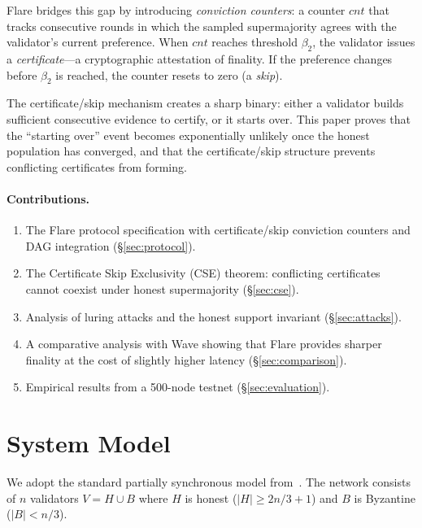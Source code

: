 \documentclass[11pt,a4paper]{article}
\begin{document}
Flare bridges this gap by introducing \emph{conviction counters}: a counter $cnt$ that
tracks consecutive rounds in which the sampled supermajority agrees with the validator's
current preference. When $cnt$ reaches threshold $\beta_2$, the validator issues a
\emph{certificate}---a cryptographic attestation of finality. If the preference changes
before $\beta_2$ is reached, the counter resets to zero (a \emph{skip}).

The certificate/skip mechanism creates a sharp binary: either a validator builds sufficient
consecutive evidence to certify, or it starts over. This paper proves that the
``starting over'' event becomes exponentially unlikely once the honest population
has converged, and that the certificate/skip structure prevents conflicting certificates
from forming.

\paragraph{Contributions.}
\begin{enumerate}[nosep]
\item The Flare protocol specification with certificate/skip conviction counters and
DAG integration (\S\ref{sec:protocol}).
\item The Certificate Skip Exclusivity (CSE) theorem: conflicting certificates cannot
coexist under honest supermajority (\S\ref{sec:cse}).
\item Analysis of luring attacks and the honest support invariant (\S\ref{sec:attacks}).
\item A comparative analysis with Wave showing that Flare provides sharper finality
at the cost of slightly higher latency (\S\ref{sec:comparison}).
\item Empirical results from a 500-node testnet (\S\ref{sec:evaluation}).
\end{enumerate}

\section{System Model}
\label{sec:model}

We adopt the standard partially synchronous model from~\cite{dwork1988consensus}.
The network consists of $n$ validators $V = H \cup B$ where $H$ is honest ($|H| \geq 2n/3 + 1$)
and $B$ is Byzantine ($|B| < n/3$).
\end{document}
